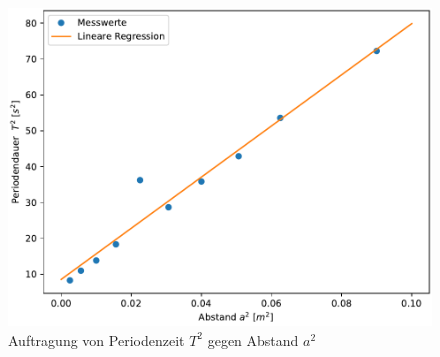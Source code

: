   \begin{figure}
    \centering
    \includegraphics{plot.pdf}
    \caption{Auftragung von Periodenzeit $T^2$ gegen Abstand $a^2$}
    \label{fig:plot}
  \end{figure}

